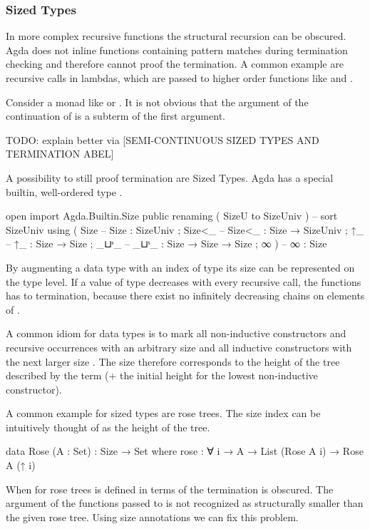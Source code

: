 \documentclass[10pt,a4paper,twoside]{report}
\begin{document}
\subsubsection{Sized Types}
In more complex recursive functions the structural recursion can be obscured.
Agda does not inline functions containing pattern matches during termination
checking and therefore cannot proof the termination.
A common example are recursive calls in lambdas, which are passed
to higher order functions like  and \AgdaFunction{>>=}.

Consider a monad like  or .
It is not obvious that the argument of the continuation of \AgdaFunction{>>=} is
a subterm of the first argument.

TODO: explain better via [SEMI-CONTINUOUS SIZED TYPES AND TERMINATION ABEL]

A possibility to still proof termination are Sized Types.
Agda has a special builtin, well-ordered type .

\begin{code}
open import Agda.Builtin.Size public
  renaming ( SizeU to SizeUniv )  --  sort SizeUniv
  using    ( Size                 --  Size   : SizeUniv
           ; Size<_               --  Size<_ : Size → SizeUniv
           ; ↑_                   --  ↑_     : Size → Size
           ; _⊔ˢ_                 --  _⊔ˢ_   : Size → Size → Size
           ; ∞ )                  --  ∞      : Size
\end{code}
By augmenting a data type with an index of type  its
size can be represented on the type level.
If a value of type  decreases with every recursive call, the
functions has to termination, because there exist no infinitely decreasing
chains on elements of .

A common idiom for data types is to mark all non-inductive constructors and
recursive occurrences with an arbitrary size  and all inductive
constructors with the next larger size
\AgdaSpace{}.
The size therefore corresponds to the height of the tree described by the term
($+$ the initial height for the lowest non-inductive constructor).

A common example for sized types are rose trees.
The size index can be intuitively thought of as the height of the tree.

\begin{code}
data Rose (A : Set) : Size → Set where
  rose : ∀ {i} → A → List (Rose A i) → Rose A (↑ i)
\end{code}
When  for rose trees is defined in terms of
 the termination is obscured.
The argument of the functions passed to  is not recognized as
structurally smaller than the given rose tree.
Using size annotations we can fix this problem.
\end{document}

